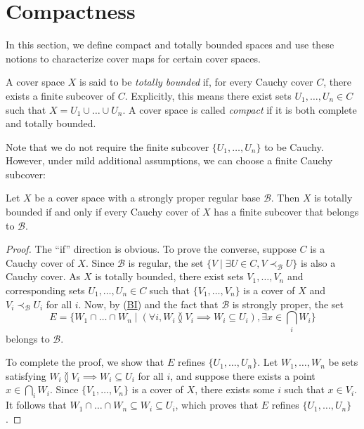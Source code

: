\documentclass[reqno]{amsart}
\newcommand{\axref}[1]{(\hyperref[ax:#1]{#1})}
\theoremstyle{definition}
\theoremstyle{remark}
\numberwithin{figure}{section}
\newcommand{\overlap}[2]{#1 \between #2}
\newcommand{\rb}{\prec}
\begin{document}
\section{Compactness}
\label{sec:compact}

In this section, we define compact and totally bounded spaces and use these notions to characterize cover maps for certain cover spaces.

A cover space $X$ is said to be \emph{totally bounded} if, for every Cauchy cover $C$, there exists a finite subcover of $C$.
Explicitly, this means there exist sets $U_1, \ldots, U_n \in C$ such that $X = U_1 \cup \ldots \cup U_n$.
A cover space is called \emph{compact} if it is both complete and totally bounded.

Note that we do not require the finite subcover $\{ U_1, \ldots, U_n \}$ to be Cauchy.
However, under mild additional assumptions, we can choose a finite Cauchy subcover:

\begin{prop}
Let $X$ be a cover space with a strongly proper regular base $\mathcal{B}$.
Then $X$ is totally bounded if and only if every Cauchy cover of $X$ has a finite subcover that belongs to $\mathcal{B}$.
\end{prop}
\begin{proof}
The ``if'' direction is obvious.
To prove the converse, suppose $C$ is a Cauchy cover of $X$.
Since $\mathcal{B}$ is regular, the set $\{ V \mid \exists U \in C, V \rb_\mathcal{B} U \}$ is also a Cauchy cover.
As $X$ is totally bounded, there exist sets $V_1, \ldots, V_n$ and corresponding sets $U_1, \ldots, U_n \in C$ such that $\{ V_1, \ldots, V_n \}$ is a cover of $X$ and $V_i \rb_\mathcal{B} U_i$ for all $i$.
Now, by \axref{BI} and the fact that $\mathcal{B}$ is strongly proper, the set
\[ E = \{ W_1 \cap \ldots \cap W_n \mid (\forall i, \overlap{W_i}{V_i} \implies W_i \subseteq U_i), \exists x \in \bigcap_i W_i \} \]
belongs to $\mathcal{B}$.

To complete the proof, we show that $E$ refines $\{ U_1, \ldots, U_n \}$.
Let $W_1, \ldots, W_n$ be sets satisfying $\overlap{W_i}{V_i} \implies W_i \subseteq U_i$ for all $i$, and suppose there exists a point $x \in \bigcap_i W_i$.
Since $\{ V_1, \ldots, V_n \}$ is a cover of $X$, there exists some $i$ such that $x \in V_i$.
It follows that $W_1 \cap \ldots \cap W_n \subseteq W_i \subseteq U_i$, which proves that $E$ refines $\{ U_1, \ldots, U_n \}$.
\end{proof}
\end{document}
